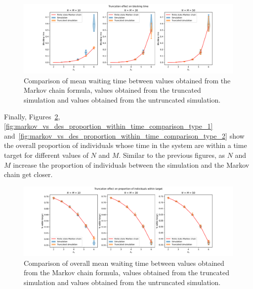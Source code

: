 \begin{figure}[H]
    \includegraphics[width=\textwidth]{chapters/03_queueing_model/Bin/numeric_results_and_timings/truncation_effect/blocking_time_type_2.pdf}
    \caption{
        Comparison of mean waiting time between values obtained from the Markov
        chain formula, values obtained from the truncated simulation and values
        obtained from the untruncated simulation.
    }
    \label{fig:markov_vs_des_blocking_time_comparison_overall}
\end{figure}

Finally, Figures~\ref{fig:markov_vs_des_proportion_within_time_comparison_overall},
\ref{fig:markov_vs_des_proportion_within_time_comparison_type_1}
and~\ref{fig:markov_vs_des_proportion_within_time_comparison_type_2} show the
overall proportion of individuals whose time in the system are within
a time target for different values of \(N\) and \(M\).
Similar to the previous figures, as \(N\) and \(M\) increase the proportion of
individuals between the simulation and the Markov chain get closer.


\begin{figure}[H]
    \includegraphics[width=\textwidth]{chapters/03_queueing_model/Bin/numeric_results_and_timings/truncation_effect/proportion_overall.pdf}
    \caption{
        Comparison of overall mean waiting time between values obtained from the
        Markov chain formula, values obtained from the truncated simulation and
        values obtained from the untruncated simulation.
    }
    \label{fig:markov_vs_des_proportion_within_time_comparison_overall}
\end{figure}

